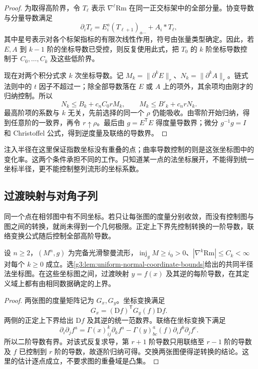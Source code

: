 \begin{proof}
	为取得高阶界，令 \(T_\ell\) 表示 \(\nabla^\ell\mathrm{Rm}\) 在同一正交标架中的全部分量。协变导数与分量导数满足
	\[
		\partial_iT_\ell=E_i^a(T_{\ell+1})_{a\cdots}+A_i*T_\ell,
	\]
	其中星号表示对各个标架指标的有限次线性作用，符号由张量类型确定。因此，若 \(E,A\) 到 \(k-1\) 阶的坐标导数已受控，则反复使用此式，把 \(T_0\) 的 \(k\) 阶坐标导数控制于 \(C_0,\ldots,C_k\) 及这些低阶界。

	现在对两个积分式求 \(k\) 次坐标导数。记
	\(M_k=\|\partial^kE\|_r\)、\(N_k=\|\partial^kA\|_r\)。链式法则中的 \(t\) 因子不超过一；除全部导数落在 \(E\) 或 \(A\) 上的项外，其余项均由刚才的归纳控制。所以
	\[
		N_k\le B_k+c_nC_0r M_k,\qquad
		M_k\le B'_k+c_nrN_k.
	\]
	最高阶项的系数与 \(k\) 无关，先前选择的同一个 \(\rho\) 仍能吸收。由零阶开始归纳，得到任意阶的一致界，再令 \(r\uparrow\rho\)。最后由 \(g=E^{\mathsf T}E\) 得度量导数界；微分 \(g^{-1}g=I\) 和 Christoffel 公式，得到逆度量及联络的导数界。
\end{proof}

注入半径在这里保证指数坐标没有重叠的点；曲率导数控制的则是这张坐标图中的变化率。这两个条件承担不同的工作。只知道某一点的法坐标展开，不能得到统一坐标半径，更不能控制整列流形的坐标系数。

\subsection{过渡映射与对角子列}
\label{g3:subsec:2901:02}
同一个点在相邻图中有不同坐标。若只让每张图的度量分别收敛，而没有控制图与图之间的转换，就尚未得到一个几何极限。正定上下界先控制转换的一阶导数，联络变换公式随后控制全部高阶导数。

\begin{lemma}\label{g3:lem:uniform-chart-transition-bounds}
	设 \(n\ge2\)，\((M^n,g)\) 为完备光滑黎曼流形，\(\operatorname{inj}_gM\ge i_0>0\)、\(|\nabla^k\mathrm{Rm}|\le C_k<\infty\) 对每个 \(k\ge0\) 成立。选\cref{g3:lem:uniform-normal-coordinate-bounds}给出的共同半径法坐标图。在这些坐标图之间，过渡映射 \(y=f(x)\) 及其逆的每阶导数，在其定义域上都有由相同数据确定的上界。
\end{lemma}
\begin{proof}
	两张图的度量矩阵记为 \(G_x,G_y\)。坐标变换满足
	\[
		G_x=(\mathrm Df)^{\mathsf T}G_y(f)\mathrm Df.
	\]
	两侧的正定上下界给出 \(\mathrm Df\) 及其逆的统一范数界。联络在坐标变换下满足
	\begin{equation}\label{g3:eq:transition-second-derivative}
		\partial_i\partial_j f^a
		=\Gamma(x)^k_{ij}\partial_k f^a
		-\Gamma(y)^a_{bc}(f)\partial_i f^b\partial_j f^c.
	\end{equation}
	所以二阶导数有界。对该式反复求导，第 \(r+1\) 阶导数只用联络至 \(r-1\) 阶的导数及 \(f\) 已控制到 \(r\) 阶的导数，故逐阶归纳可得。交换两张图便得逆转换的结论。这里的估计逐点成立，不要求图的重叠域是凸集。
\end{proof}

